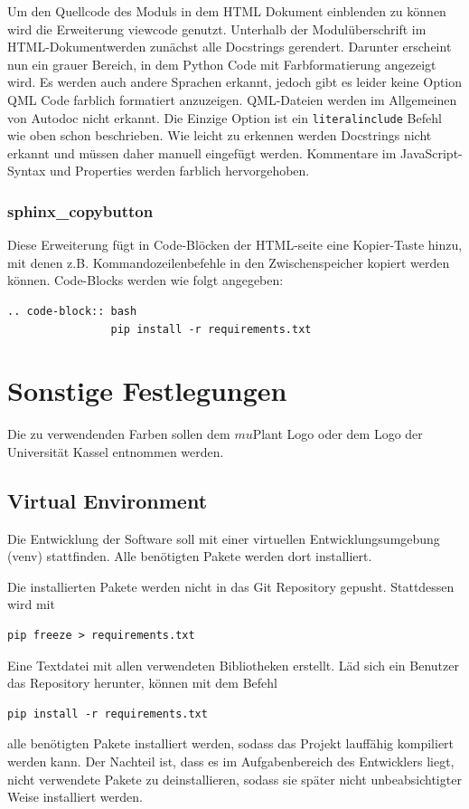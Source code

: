 Um den Quellcode des Moduls in dem HTML Dokument einblenden zu können wird die Erweiterung viewcode genutzt.
Unterhalb der Modulüberschrift im HTML-Dokumentwerden zunächst alle Docstrings gerendert.
Darunter erscheint nun ein grauer Bereich, in dem Python Code mit Farbformatierung angezeigt wird.
Es werden auch andere Sprachen erkannt, jedoch gibt es leider keine Option QML Code farblich formatiert
anzuzeigen.
QML-Dateien werden im Allgemeinen von Autodoc nicht erkannt.
Die Einzige Option ist ein \verb|literalinclude| Befehl wie oben schon beschrieben.
Wie leicht zu erkennen werden Docstrings nicht erkannt und müssen daher manuell eingefügt werden.
Kommentare im JavaScript-Syntax und Properties werden farblich hervorgehoben.

\subsubsection{sphinx\_copybutton}

Diese Erweiterung fügt in Code-Blöcken der HTML-seite eine Kopier-Taste hinzu, mit denen 
z.B. Kommandozeilenbefehle in den Zwischenspeicher kopiert werden können.
Code-Blocks werden wie folgt angegeben:
\begin{lstlisting}[label={lst:sphinxCodebutton}]
        .. code-block:: bash
                pip install -r requirements.txt
\end{lstlisting}


\section{Sonstige Festlegungen}

Die zu verwendenden Farben sollen dem $mu$Plant Logo oder dem Logo der Universität Kassel entnommen werden.

\subsection{Virtual Environment}

Die Entwicklung der Software soll mit einer virtuellen Entwicklungsumgebung (venv) stattfinden.
Alle benötigten Pakete werden dort installiert.

Die installierten Pakete werden nicht in das Git Repository gepusht. Stattdessen wird mit
\begin{lstlisting}[label={lst:freezeReq}]
        pip freeze > requirements.txt
\end{lstlisting}
Eine Textdatei mit allen verwendeten Bibliotheken erstellt.
Läd sich ein Benutzer das Repository herunter, können mit dem Befehl
\begin{lstlisting}[label={lst:installReq}]
        pip install -r requirements.txt
\end{lstlisting}
alle benötigten Pakete installiert werden, sodass das Projekt lauffähig kompiliert werden kann.
Der Nachteil ist, dass es im Aufgabenbereich des Entwicklers liegt, nicht verwendete Pakete zu deinstallieren,
sodass sie später nicht unbeabsichtigter Weise installiert werden.


